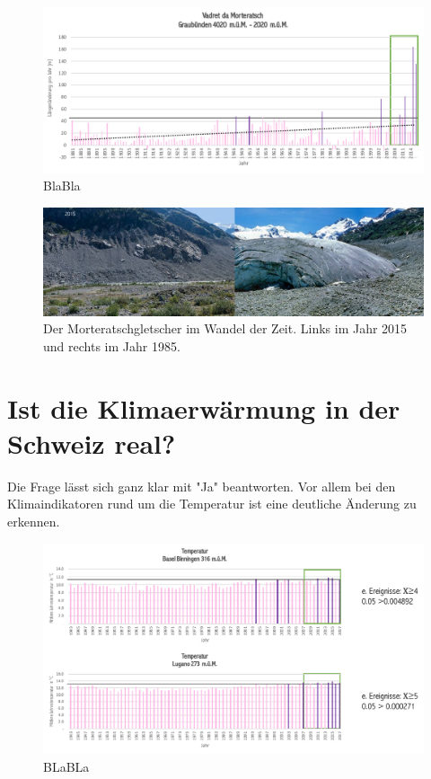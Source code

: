 \begin{refsection}
\begin{figure}[htbp]
\centering
\includegraphics[width=1.0\textwidth]{extrem/Morteratsch.pdf}
\caption{BlaBla}
\label{Morteratschtab}
\end{figure}


\begin{figure}[htbp]
\centering
\includegraphics[width=1.0\textwidth]{extrem/Morteratsch.jpg}
\caption{Der Morteratschgletscher im Wandel der Zeit. Links im Jahr 2015 und rechts im Jahr 1985.}
\label{Morteratsch}
\end{figure}



\section{Ist die Klimaerwärmung in der Schweiz real?}
Die Frage lässt sich ganz klar mit "Ja" beantworten. Vor allem bei den Klimaindikatoren rund um die Temperatur ist eine deutliche Änderung zu erkennen. 




\begin{figure}[htbp]
\centering
\includegraphics[width=1.0\textwidth]{extrem/JMittel.pdf}
\caption{BLaBLa}
\label{JMittel}
\end{figure}


\end{refsection}
